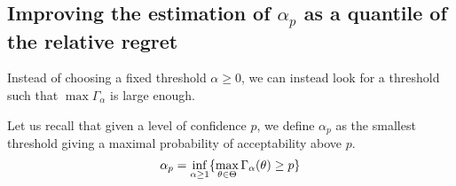 \documentclass[../../Main_ManuscritThese.tex]{subfiles}
\begin{document}




\subsection{Improving the estimation of $\alpha_p$ as a quantile of the relative regret}
\label{sec:quantile_rr}
Instead of choosing a fixed threshold $\alpha \geq 0$, we can instead
look for a threshold such that $\max \Gamma_{\alpha}$ is large
enough. %

Let us recall that given a level of confidence $p$, we define
$\alpha_p$ as the smallest threshold giving a maximal probability of
acceptability above $p$.
\begin{equation}
  \alpha_p = \inf_{\alpha \geq 1}\{\max_{\theta \in \Theta}\Gamma_{\alpha}(\theta)\geq p \}
\end{equation}
\end{document}
